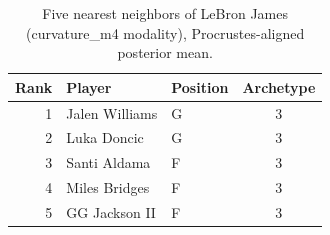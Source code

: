 \begin{table}[htbp]
  \centering\small
  \begin{tabular}{rllc}
    \toprule
    Rank & Player & Position & Archetype \\
    \midrule
    1 & Jalen Williams & G & 3 \\
    2 & Luka Doncic & G & 3 \\
    3 & Santi Aldama & F & 3 \\
    4 & Miles Bridges & F & 3 \\
    5 & GG Jackson II & F & 3 \\
    \bottomrule
  \end{tabular}
  \caption{Five nearest neighbors of LeBron James (curvature_m4 modality), Procrustes-aligned posterior mean.}
  \label{tab:LeBron_James_neighbors_curvature_m4}
\end{table}

